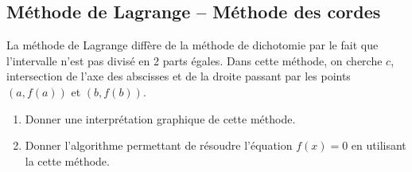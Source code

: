 \documentclass[10pt,fleqn]{article} %
\begin{document}
\subsection{Méthode de Lagrange -- Méthode des cordes}

La méthode de Lagrange diffère de la méthode de dichotomie par le fait que l'intervalle n'est pas divisé en 2 parts égales. Dans cette méthode, on cherche $c$, intersection de l'axe des abscisses et de la droite passant par les points $(a,f(a))$ et $(b,f(b))$.

\begin{enumerate}
\item Donner une interprétation graphique de cette méthode.
\item Donner l'algorithme permettant de résoudre l'équation $f(x)=0$ en utilisant la cette méthode.
\end{enumerate}
\end{document}
